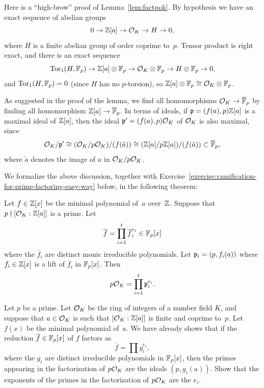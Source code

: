 \begin{remark}
  Here is a ``high-brow'' proof of Lemma~\ref{lem:factpok}.
  By hypothesis we have an exact sequence of abelian groups
  $$
    0 \to \mathbb{Z}[a] \to \mathcal{O}_K \to H \to 0,
  $$
  where $H$ is a finite abelian group of order coprime to~$p$.
  Tensor product is right exact, and there is an exact sequence
  $$
     \operatorname{Tor}_1(H,\mathbb{F}_p) \to \mathbb{Z}[a]\otimes\mathbb{F}_p \to \mathcal{O}_K\otimes\mathbb{F}_p \to H\otimes\mathbb{F}_p \to 0,
  $$
  and $\operatorname{Tor}_1(H,\mathbb{F}_p) = 0$ (since $H$ has no $p$-torsion),
  so $\mathbb{Z}[a]\otimes\mathbb{F}_p \cong \mathcal{O}_K\otimes\mathbb{F}_p$.
\end{remark}

As suggested in the proof of the lemma, we find all homomorphisms
$\mathcal{O}_K\to \overline{\mathbb{F}}_p$ by finding all homomorphism
$\mathbb{Z}[a] \to \overline{\mathbb{F}}_p$.  In
terms of ideals, if $\mathfrak{p} = (f(a),p)\mathbb{Z}[a]$ is a maximal ideal of $\mathbb{Z}[a]$,
then the ideal $\mathfrak{p}' = (f(a),p)\mathcal{O}_K$ of $\mathcal{O}_K$ is also maximal, since
$$
  \mathcal{O}_K/\mathfrak{p}'\cong (\mathcal{O}_K/p\mathcal{O}_K)/(f(\tilde{a}))
  \cong
  (\mathbb{Z}[a]/p\mathbb{Z}[a]) / (f(\tilde{a})) \subset \overline{\mathbb{F}}_p,
$$
where $\tilde{a}$ denotes the image of $a$ in $\mathcal{O}_K/p\mathcal{O}_K$.

We formalize the above discussion, together with
Exercise~\ref{exercise:ramification-for-prime-factoring-easy-way} below,
in the following theorem:
\begin{theorem}\label{thm:fac1}
  Let $f\in\mathbb{Z}[x]$ be the minimal polynomial of~$a$ over~$\mathbb{Z}$.
  Suppose that~$p\nmid [\mathcal{O}_K:\mathbb{Z}[a]]$ is a prime. Let
  $$
    \overline{f} = \prod_{i=1}^t \overline{f}_i^{e_i} \in \mathbb{F}_p[x]
  $$
  where the $\overline{f}_i$ are distinct monic irreducible
  polynomials. Let $\mathfrak{p}_i = (p,f_i(a))$ where $f_i\in\mathbb{Z}[x]$ is a
  lift of $\overline{f}_i$ in $\mathbb{F}_p[x]$. Then
  $$
    p\mathcal{O}_K = \prod_{i=1}^t \mathfrak{p}_i^{e_i}.
  $$
\end{theorem}

\begin{exercise}\label{exercise:ramification-for-prime-factoring-easy-way}
  Let $p$ be a prime. Let $\mathcal{O}_K$ be the ring of integers of a number
  field $K$, and suppose that $a\in \mathcal{O}_K$ is such that $[\mathcal{O}_K:\mathbb{Z}[a]]$ is
  finite and coprime to~$p$. Let $f(x)$ be the minimal polynomial of~$a$.
  We have already shows that if the reduction $\overline{f}\in\mathbb{F}_p[x]$ of $f$
  factors as
  $$
    \overline{f} = \prod g_i^{e_i},
  $$
  where the $g_i$ are distinct irreducible polynomials in $\mathbb{F}_p[x]$,
  then the primes appearing in the factorization of $p\mathcal{O}_K$ are the
  ideals $(p,g_i(a))$. Show that the exponents of the primes in the
  factorization of $p\mathcal{O}_K$ are the $e_i$.
\end{exercise}


